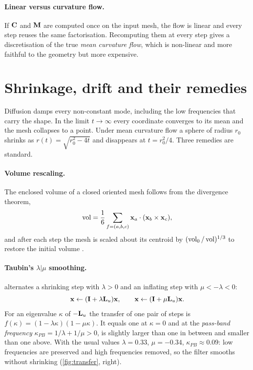 \paragraph{Linear versus curvature flow.} If $\mathbf{C}$ and $\mathbf{M}$ are computed once on the input mesh,
the flow is linear and every step reuses the same factorisation. Recomputing them at every step
gives a discretisation of the true \emph{mean curvature flow}, which is non-linear and more
faithful to the geometry but more expensive.

\section{Shrinkage, drift and their remedies}

Diffusion damps every non-constant mode, including the low frequencies that carry the shape. In
the limit $t\to\infty$ every coordinate converges to its mean and the mesh collapses to a point.
Under mean curvature flow a sphere of radius $r_0$ shrinks as $r(t)=\sqrt{r_0^2-4t}$ and
disappears at $t=r_0^2/4$. Three remedies are standard.

\paragraph{Volume rescaling.} The enclosed volume of a closed oriented mesh follows from the
divergence theorem,
\begin{equation}
\operatorname{vol}=\frac16\sum_{f=(a,b,c)}\mathbf{x}_a\cdot(\mathbf{x}_b\times\mathbf{x}_c),
\end{equation}
and after each step the mesh is scaled about its centroid by $(\operatorname{vol}_0/\operatorname{vol})^{1/3}$ to restore the
initial volume \citep{Desbrun1999}.

\paragraph{Taubin's $\lambda|\mu$ smoothing.} \citet{Taubin1995} alternates a shrinking step with
$\lambda>0$ and an inflating step with $\mu<-\lambda<0$:
\begin{equation}
\mathbf{x}\leftarrow(\mathbf{I}+\lambda\mathbf{L}_u)\mathbf{x},\qquad\mathbf{x}\leftarrow(\mathbf{I}+\mu\mathbf{L}_u)\mathbf{x} .
\end{equation}
For an eigenvalue $\kappa$ of $-\mathbf{L}_u$ the transfer of one pair of steps is
$f(\kappa)=(1-\lambda\kappa)(1-\mu\kappa)$. It equals one at $\kappa=0$ and at the
\emph{pass-band frequency} $\kappa_{PB}=1/\lambda+1/\mu>0$, is slightly larger than one in between
and smaller than one above. With the usual values $\lambda=0.33$, $\mu=-0.34$, $\kappa_{PB}\approx0.09$:
low frequencies are preserved and high frequencies removed, so the filter smooths without shrinking
(\cref{fig:transfer}, right).


